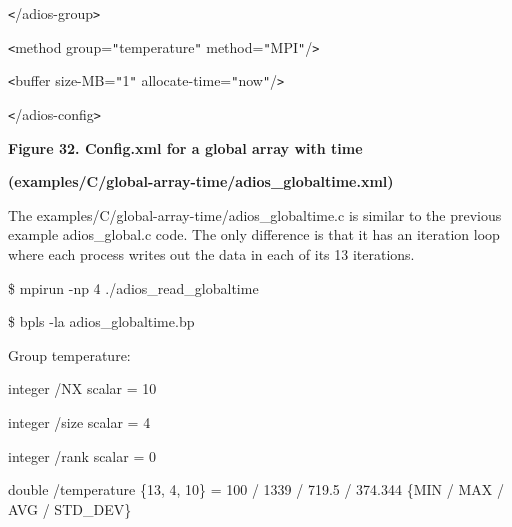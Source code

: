 \vspace{10pt}
\parindent=57pt
\texttt{<}/adios-group\texttt{>}

\vspace{10pt}
\parindent=0pt
\texttt{<}method group=\texttt{"}temperature\texttt{"} method=\texttt{"}MPI\texttt{"}/\texttt{>}

\vspace{10pt}
\texttt{<}buffer size-MB=\texttt{"}1\texttt{"} allocate-time=\texttt{"}now\texttt{"}/\texttt{>}

\vspace{10pt}
\texttt{<}/adios-config\texttt{>}

\label{HToc144350191}

\vspace{22pt}
\begin{center}
{\color{color20} \textbf{Figure 32. Config.xml for a global array with time}}

\vspace{10pt}
{\color{color20} \textbf{(examples/C/global-array-time/adios\_globaltime.xml)}}
\end{center}

\vspace{10pt}
\baselineskip=13pt
The examples/C/global-array-time/adios\_globaltime.c is similar to the previous 
example adios\_global.c code. The only difference is that it has an iteration loop 
where each process writes out the data in each of its 13 iterations.

\vspace{23pt}
\$ mpirun -np 4 ./adios\_read\_globaltime

\vspace{10pt}
\$ bpls -la adios\_globaltime.bp 

\vspace{10pt}
Group temperature:

\vspace{10pt}
\parindent=7pt
integer    /NX                       scalar = 10

\vspace{10pt}
integer    /size                     scalar = 4

\vspace{10pt}
\parindent=14pt
integer    /rank                     scalar = 0

\vspace{10pt}
\parindent=7pt
double     /temperature              \{13, 4, 10\} = 100 / 1339 / 719.5 / 374.344 
 \{MIN / MAX / AVG / STD\_DEV\}

